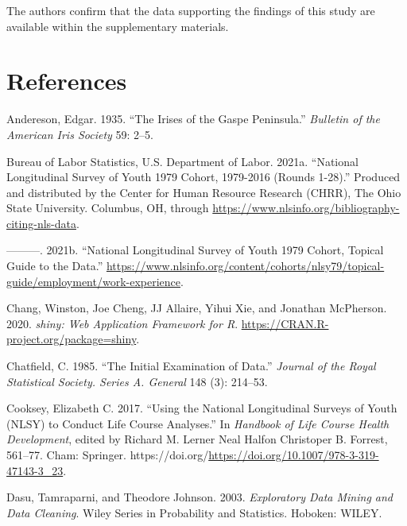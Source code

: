 \documentclass{article}
\newlength{\cslhangindent}
\newlength{\cslentryspacingunit} %
\newenvironment{CSLReferences}[2] %
 {%
  \setlength{\parindent}{0pt}
  \ifodd #1
  \let\oldpar\par
  \def\par{\hangindent=\cslhangindent\oldpar}
  \fi
  \setlength{\parskip}{#2\cslentryspacingunit}
 }%
 {}
\begin{document}
The authors confirm that the data supporting the findings of this study are available within the supplementary materials.

\hypertarget{references}{%
\section*{References}\label{references}}

\hypertarget{refs}{}
\begin{CSLReferences}{1}{0}
\leavevmode{}%
Andereson, Edgar. 1935. {``The Irises of the Gaspe Peninsula.''} \emph{Bulletin of the American Iris Society} 59: 2--5.

\leavevmode{}%
Bureau of Labor Statistics, U.S. Department of Labor. 2021a. {``National Longitudinal Survey of Youth 1979 Cohort, 1979-2016 (Rounds 1-28).''} Produced and distributed by the Center for Human Resource Research (CHRR), The Ohio State University. Columbus, OH, through \url{https://www.nlsinfo.org/bibliography-citing-nls-data}.

\leavevmode{}%
---------. 2021b. {``National Longitudinal Survey of Youth 1979 Cohort, Topical Guide to the Data.''} \url{https://www.nlsinfo.org/content/cohorts/nlsy79/topical-guide/employment/work-experience}.

\leavevmode{}%
Chang, Winston, Joe Cheng, JJ Allaire, Yihui Xie, and Jonathan McPherson. 2020. \emph{{shiny: Web Application Framework for R}}. \url{https://CRAN.R-project.org/package=shiny}.

\leavevmode{}%
Chatfield, C. 1985. {``The Initial Examination of Data.''} \emph{Journal of the Royal Statistical Society. Series A. General} 148 (3): 214--53.

\leavevmode{}%
Cooksey, Elizabeth C. 2017. {``Using the National Longitudinal Surveys of Youth (NLSY) to Conduct Life Course Analyses.''} In \emph{Handbook of Life Course Health Development}, edited by Richard M. Lerner Neal Halfon Christoper B. Forrest, 561--77. Cham: Springer. https://doi.org/\url{https://doi.org/10.1007/978-3-319-47143-3_23}.

\leavevmode{}%
Dasu, Tamraparni, and Theodore Johnson. 2003. \emph{Exploratory Data Mining and Data Cleaning}. Wiley Series in Probability and Statistics. Hoboken: WILEY.


\end{CSLReferences}
\end{document}
